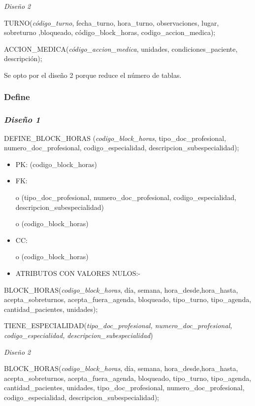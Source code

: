 \documentclass[a4paper,11pt]{article}
\begin{document}
\textit{Diseño 2}

TURNO(\emph{código\_turno}, fecha\_turno, hora\_turno, observaciones, lugar, sobreturno 
,bloqueado, código\_block\_horas, codigo\_accion\_medica);

ACCION\_MEDICA(\emph{código\_accion\_medica}, unidades, condiciones\_paciente, 
descripción);

Se opto por el diseño 2 porque reduce el número de tablas.\label{HToc293405851}

\subsubsection{\textbf{Define\label{HToc293405852}}}

\subsubsection{\textit{Diseño 1}}

DEFINE\_BLOCK\_HORAS (\emph{codigo\_block\_horas},  tipo\_doc\_profesional, numero\_doc\_profesional, 
codigo\_especialidad, descripcion\_subespecialidad);

\begin{itemize}
\item PK: (codigo\_block\_horas)

\item FK: 

o (tipo\_doc\_profesional, numero\_doc\_profesional, codigo\_especialidad, descripcion\_subespecialidad)

o (codigo\_block\_horas)

\item CC:

o (codigo\_block\_horas)

\item ATRIBUTOS CON VALORES NULOS:-
\end{itemize}

BLOCK\_HORAS(\emph{codigo\_block\_horas}, día, semana, hora\_desde,hora\_hasta, 
acepta\_sobreturnos, acepta\_fuera\_agenda, bloqueado, tipo\_turno, tipo\_agenda, 
cantidad\_pacientes, unidades);

TIENE\_ESPECIALIDAD(\emph{tipo\_doc\_profesional, numero\_doc\_profesional, codigo\_especialidad,} 
\emph{descripcion\_subespecialidad})

\textit{Diseño 2}

BLOCK\_HORAS(\emph{codigo\_block\_horas}, día, semana, hora\_desde,hora\_hasta, 
acepta\_sobreturnos, acepta\_fuera\_agenda, bloqueado, tipo\_turno, tipo\_agenda, 
cantidad\_pacientes, unidades,\emph{ }tipo\_doc\_profesional, numero\_doc\_profesional, 
codigo\_especialidad, descripcion\_subespecialidad);
\end{document}
